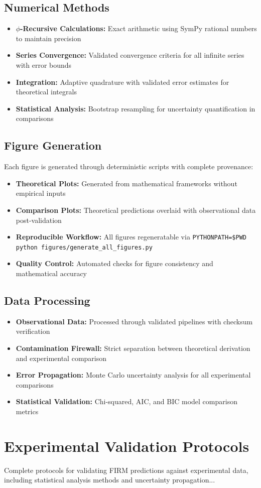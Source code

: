\documentclass[12pt]{article}
\begin{document}
\subsection{Numerical Methods}

\begin{itemize}
    \item \textbf{$\phi$-Recursive Calculations:} Exact arithmetic using SymPy rational numbers to maintain precision
    \item \textbf{Series Convergence:} Validated convergence criteria for all infinite series with error bounds
    \item \textbf{Integration:} Adaptive quadrature with validated error estimates for theoretical integrals
    \item \textbf{Statistical Analysis:} Bootstrap resampling for uncertainty quantification in comparisons
\end{itemize}

\subsection{Figure Generation}

Each figure is generated through deterministic scripts with complete provenance:
\begin{itemize}
    \item \textbf{Theoretical Plots:} Generated from mathematical frameworks without empirical inputs
    \item \textbf{Comparison Plots:} Theoretical predictions overlaid with observational data post-validation
    \item \textbf{Reproducible Workflow:} All figures regeneratable via \texttt{PYTHONPATH=\$PWD python figures/generate\_all\_figures.py}
    \item \textbf{Quality Control:} Automated checks for figure consistency and mathematical accuracy
\end{itemize}

\subsection{Data Processing}

\begin{itemize}
    \item \textbf{Observational Data:} Processed through validated pipelines with checksum verification
    \item \textbf{Contamination Firewall:} Strict separation between theoretical derivation and experimental comparison
    \item \textbf{Error Propagation:} Monte Carlo uncertainty analysis for all experimental comparisons
    \item \textbf{Statistical Validation:} Chi-squared, AIC, and BIC model comparison metrics
\end{itemize}

\section{Experimental Validation Protocols}

Complete protocols for validating FIRM predictions against experimental data, including statistical analysis methods and uncertainty propagation...


\end{document}
